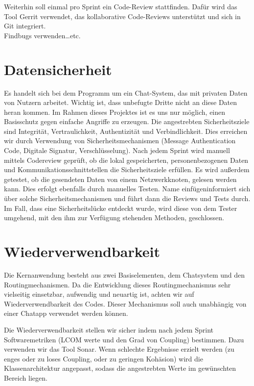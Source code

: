 \documentclass{tudreport}
\begin{document}
                Weiterhin soll einmal pro Sprint ein Code-Review stattfinden. Dafür wird das Tool Gerrit verwendet, das kollaborative Code-Reviews unterstützt und sich in Git integriert.\\

                Findbugs verwenden\ldots etc.
                
                

        \section{Datensicherheit}
        
        Es handelt sich bei dem Programm um ein Chat-System, das mit privaten Daten von Nutzern arbeitet. Wichtig ist, dass unbefugte Dritte nicht an diese Daten heran kommen.
        Im Rahmen dieses Projektes ist es uns nur möglich, einen Basisschutz gegen einfache Angriffe zu erzeugen. Die angestrebten Sicherheitsziele sind Integrität, Vertraulichkeit, Authentizität und Verbindlichkeit.
        Dies erreichen wir durch Verwendung von Sicherheitsmechanismen (Message Authentication Code, Digitale Signatur, Verschlüsselung).
        Nach jedem Sprint wird manuell mittels Codereview geprüft, ob die lokal gespeicherten, personenbezogenen Daten und Kommunikationsschnittstellen die Sicherheitsziele erfüllen.
        Es wird außerdem getestet, ob die gesendeten Daten von einem Netzwerkknoten, gelesen werden kann. Dies erfolgt ebenfalls durch manuelles Testen.
        \glqq Name einfügen\grqq informiert sich über solche Sicherheitsmechanismen und führt dann die Reviews und Tests durch. 
        Im Fall, dass eine Sicherheitslücke entdeckt wurde, wird diese von dem Tester umgehend, mit den ihm zur Verfügung stehenden Methoden, geschlossen.
        
        \section{Wiederverwendbarkeit}
        
        Die Kernanwendung besteht aus zwei Basiselementen, dem Chatsystem und den Routingmechanismen. Da die Entwicklung dieses Routingmechanismus sehr vielseitig einsetzbar, aufwendig und neuartig ist, achten wir auf Wiederverwendbarkeit des Codes. Dieser Mechanismus soll auch unabhängig von einer Chatapp verwendet werden können.
        
        Die Wiederverwendbarkeit stellen wir sicher indem nach jedem Sprint Softwaremetriken (LCOM werte und den Grad von Coupling) bestimmen. Dazu verwenden wir das Tool Sonar. Wenn schlechte Ergebnisse erzielt werden (zu enges oder zu loses Coupling, oder zu geringen Kohäsion) wird die Klassenarchitektur angepasst, sodass die angestrebten Werte im gewünschten Bereich liegen.
        
\end{document}
